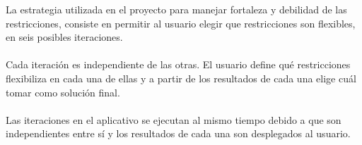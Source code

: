 La estrategia utilizada en el proyecto para manejar fortaleza y debilidad de las restricciones, consiste en permitir al usuario elegir que restricciones son flexibles, en seis posibles iteraciones.
\\\\
Cada iteración es independiente de las otras. El usuario define qué restricciones flexibiliza en cada una de ellas y a partir de los resultados de cada una elige cuál tomar como solución final. 
\\\\
Las iteraciones en el aplicativo se ejecutan al mismo tiempo debido a que son independientes entre sí y los resultados de cada una son desplegados al usuario.
